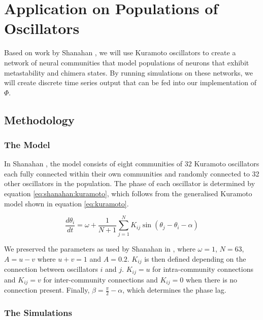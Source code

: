 \documentclass[a4paper,11pt]{article}
\begin{document}
\section{Application on Populations of Oscillators}
\label{MSUKO}

Based on work by Shanahan \cite{Shanahan2010}, we will use Kuramoto oscillators to create a network of neural communities that model populations of neurons that exhibit metastability and chimera states. By running simulations on these networks, we will create discrete time series output that can be fed into our implementation of $\Phi$.

\subsection{Methodology}

\subsubsection{The Model}
\label{sec:osc:mod}

In Shanahan \cite{Shanahan2010}, the model consists of eight communities of 32 Kuramoto oscillators each fully connected within their own communities and randomly connected to 32 other oscillators in the population. The phase of each oscillator is determined by equation \ref{eq:shanahan:kuramoto}, which follows from the generalised Kuramoto model shown in equation \ref{eq:kuramoto}. 

\begin{equation} \label{eq:shanahan:kuramoto}
\frac{d\theta_i}{dt} = \omega + \frac{1}{N + 1} \sum_{j=1}^{N} K_{ij} \sin(\theta_j - \theta_i - \alpha)
\end{equation}

We preserved the parameters as used by Shanahan in \cite{Shanahan2010}, where $\omega = 1$, $N = 63$, $A = u - v$ where $u + v = 1$ and $A = 0.2$. $K_{ij}$ is then defined depending on the connection between oscillators $i$ and $j$. $K_{ij} = u$ for intra-community connections and $K_{ij} = v$ for inter-community connections and $K_{ij} = 0$ when there is no connection present. Finally, $\beta = \frac{\pi}{2} - \alpha$, which determines the phase lag.

\subsubsection{The Simulations}
\label{sec:osc:sims}
\end{document}
